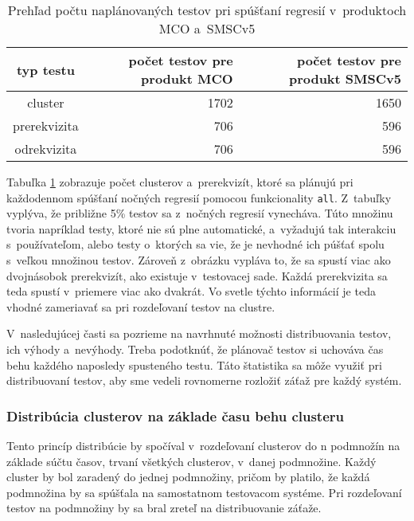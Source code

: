 \begin{table}
  \begin{center}
    \begin{tabular}{| c | r | r |}
    \hline
    typ testu  & počet testov pre produkt MCO & počet testov pre produkt SMSCv5 \\ \hline
    cluster      & 1702 & 1650 \\ \hline
    prerekvizita & 706  & 596  \\ \hline
    odrekvizita  & 706  & 596 \\
    \hline
    \end{tabular}
    \label{tabulka:pocet_naplanovanych_testov}
    \caption{Prehľad počtu naplánovaných testov pri spúšťaní regresií v~produktoch MCO a~SMSCv5}
  \end{center}
\end{table}

Tabuľka \ref{tabulka:pocet_naplanovanych_testov} zobrazuje počet clusterov a~prerekvizít, ktoré sa plánujú
pri každodennom spúšťaní nočných regresií pomocou funkcionality \texttt{all}. Z~tabuľky vyplýva, že približne 5\% testov sa 
z~nočných regresií vynecháva. Túto množinu tvoria napríklad testy, ktoré nie sú plne automatické, a~vyžadujú tak interakciu s~používateľom,
alebo testy o~ktorých sa vie, že je nevhodné ich púšťať spolu s~veľkou množinou testov.
Zároveň z~obrázku vypláva to, že sa spustí viac ako dvojnásobok prerekvizít, ako existuje v~testovacej sade.
Každá prerekvizita sa teda spustí v~priemere viac ako dvakrát. 
Vo svetle týchto informácií je teda vhodné zameriavať sa pri rozdeľovaní testov na clustre.

V~nasledujúcej časti sa pozrieme na navrhnuté možnosti distribuovania testov, ich výhody a~nevýhody.
Treba podotknúť, že plánovač testov si uchováva čas behu každého naposledy spusteného testu.
Táto štatistika sa môže využiť pri distribuovaní testov, aby sme vedeli rovnomerne rozložiť záťaž pre každý systém.
\subsubsection*{Distribúcia clusterov na základe času behu clusteru}
Tento princíp distribúcie by spočíval v~rozdeľovaní clusterov do n podmnožín na základe súčtu časov, 
trvaní všetkých clusterov, v~danej podmnožine. Každý cluster by bol zaradený do jednej podmnožiny, pričom by platilo,
že každá podmnožina by sa spúšťala na samostatnom testovacom systéme. Pri rozdeľovaní testov na podmnožiny by sa bral zreteľ na
distribuovanie záťaže.

